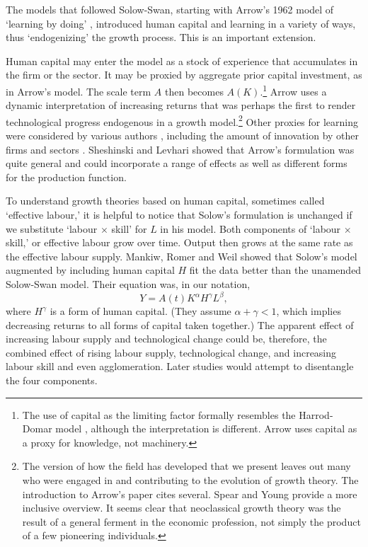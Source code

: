 The models that followed Solow-Swan, starting with Arrow's 1962 model of `learning by doing' \cite{arrowEconomicImplicationsLearning1962}, introduced \gls{human capital} and learning in a variety of ways, thus `endogenizing' the growth process. %
This is an important extension. 

Human capital may enter the model as a stock of experience that accumulates in the firm or the sector. It may be proxied by aggregate prior capital investment, as in Arrow's model. The scale term $A$ then becomes $A(K)$.\footnote{The use of capital as the limiting factor formally resembles the Harrod-Domar model \cite{harrodEssayDynamicTheory1939, domarCapitalExpansionRate1946}, although the interpretation is different. Arrow uses capital as a proxy for knowledge, not machinery.} Arrow uses a dynamic interpretation of increasing returns that was perhaps the first to render technological progress endogenous in a growth model.\footnote{The version of how the field has developed that we present leaves out many who were engaged in and contributing to the evolution of growth theory. The introduction to  Arrow's paper cites several. Spear and Young \cite{spearMACROECONOMICDYNAMICSSURVEY2018} provide a more inclusive overview. It seems clear that neoclassical growth theory was the result of a general ferment in the economic profession, not simply the product of a few pioneering individuals.} 
Other proxies for learning were considered by various authors \cite{levhariExtensionsArrowLearning1966, sheshinskiOptimalAccumulationLearning1967}, including the amount of innovation by other firms and sectors  \cite{kingEndogenousGrowthRole1989}. Sheshinski and Levhari showed that Arrow's formulation was quite general and could incorporate a range of effects as well as different forms for the production function.


To understand growth theories based on \gls{human capital},  sometimes called `\gls{effective labour},' it is helpful to notice that Solow's formulation is unchanged if we substitute `labour $\times$ skill' for $L$ in his model. Both components of `labour $\times$  skill,' or effective labour grow over time. Output then grows at the same rate as the effective labour supply. Mankiw, Romer and Weil \cite{mankiwContributionEmpiricsEconomic1992} showed that  
Solow's model augmented by including human capital $H$  fit the data better than the unamended Solow-Swan model. Their equation was, in our notation,   
\begin{equation*}
Y=A(t)K^\alpha H^\gamma L^\beta, 
\end{equation*}
where $H^\gamma$ is a form of human capital. (They assume $\alpha+\gamma<1$, which implies decreasing returns to all forms of capital taken together.) The apparent effect of increasing labour supply and technological change could be, therefore, the combined effect of rising labour supply, technological change, and increasing labour skill and even agglomeration. Later studies would attempt to disentangle the four components.


